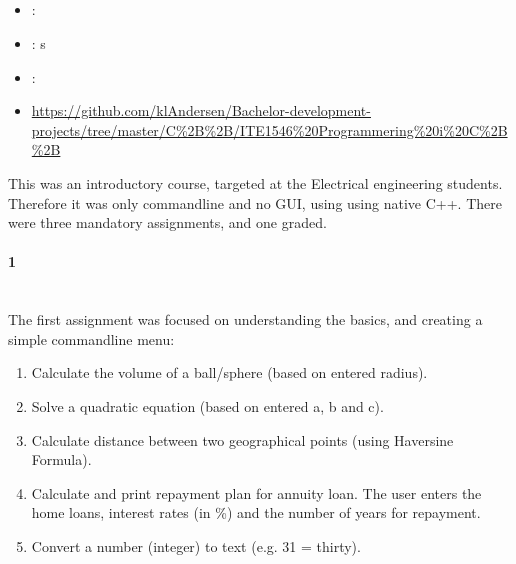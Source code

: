 \label{sec:section3}

\subsection[C++ course]{}
\label{sec:cpp_programming}
\begin{itemize} 
	\item {}: 
	\item {}: s
	\item {}: 
	\item {} \url{https://github.com/klAndersen/Bachelor-development-projects/tree/master/C%2B%2B/ITE1546%20Programmering%20i%20C%2B%2B}
\end{itemize} 
This was an introductory course, targeted at the Electrical engineering students. 
Therefore it was only commandline and no GUI, using using native C++.
There were three mandatory assignments, and one graded.

\paragraph{ 1} ~\\
The first assignment was focused on understanding the basics, and creating a simple commandline menu:
\begin{enumerate}
	\item Calculate the volume of a ball/sphere (based on entered radius).
	\item Solve a quadratic equation (based on entered a, b and c).
	\item Calculate distance between two geographical points (using Haversine Formula).
	\item Calculate and print repayment plan for annuity loan.
	The user enters the home loans, interest rates (in \%) and the number of years for repayment. 
	\item Convert a number (integer) to text (e.g. 31 = thirty).
\end{enumerate}

